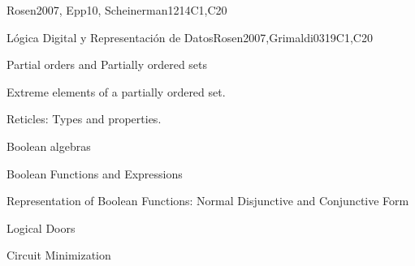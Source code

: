 \begin{syllabus}
\begin{unit}{\DSProofTechniques}{}{Rosen2007, Epp10, Scheinerman12}{14}{C1,C20}
\begin{topics}%
        \item \DSProofTechniquesTopicNotions%
        \item \DSProofTechniquesTopicThe%
        \item \DSProofTechniquesTopicDirect%
        \item \DSProofTechniquesTopicDisproving%
        \item \DSProofTechniquesTopicProof%
        \item \DSProofTechniquesTopicInduction%
        \item \DSProofTechniquesTopicStructural%
        \item \DSProofTechniquesTopicWeak%
        \item \DSProofTechniquesTopicRecursive%
        \item \DSProofTechniquesTopicWell%
\end{topics}

\begin{learningoutcomes}
	\item \DSProofTechniquesLOIdentifyTheUsed [\Assessment]
	\item \DSProofTechniquesLOOutline [\Usage ]
	\item \DSProofTechniquesLOApplyEach [\Usage ]
	\item \DSProofTechniquesLODetermineWhich [\Assessment]
	\item \DSProofTechniquesLOExplainTheIdeas [\Familiarity ]
	\item \DSProofTechniquesLOExplainTheWeak [\Assessment]
	\item \DSProofTechniquesLOStateThe [\Familiarity]
\end{learningoutcomes}
\end{unit}

\begin{unit}{}{Lógica Digital y Representación de Datos}{Rosen2007,Grimaldi03}{19}{C1,C20}
   \begin{topics}
	\item Partial orders and Partially ordered sets     
 	\item Extreme elements of a partially ordered set.
	\item Reticles: Types and properties.
	\item Boolean algebras
	\item Boolean Functions and Expressions
	\item Representation of Boolean Functions: Normal Disjunctive and Conjunctive Form
	\item Logical Doors
	\item Circuit Minimization
   \end{topics}


\end{unit}
\end{syllabus}

